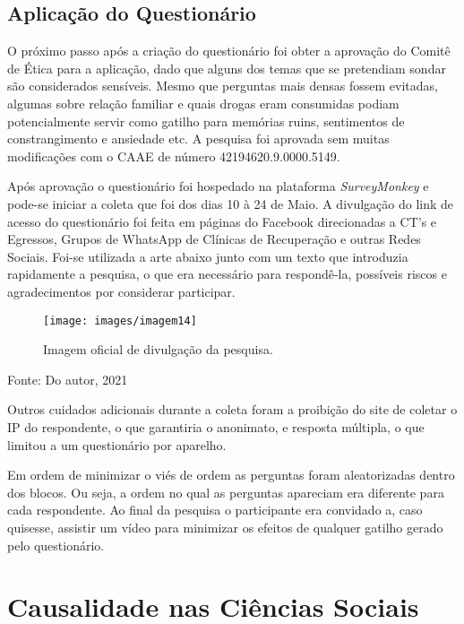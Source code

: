 \documentclass[
	12pt,				%
	oneside,			%
	a4paper,			%
	sumario=tradicional,
	english,			%
	brazil				%
	]{abntex2}
\newcommand{\bcenter}{\begin{center}}
\newcommand{\ecenter}{\end{center}}
\begin{document}
\hypertarget{aplicauxe7uxe3o-do-questionuxe1rio}{%
\subsection{Aplicação do Questionário}\label{aplicauxe7uxe3o-do-questionuxe1rio}}

O próximo passo após a criação do questionário foi obter a aprovação do Comitê de Ética para a aplicação, dado que alguns dos temas que se pretendiam sondar são considerados sensíveis. Mesmo que perguntas mais densas fossem evitadas, algumas sobre relação familiar e quais drogas eram consumidas podiam potencialmente servir como gatilho para memórias ruins, sentimentos de constrangimento e ansiedade etc. A pesquisa foi aprovada sem muitas modificações com o CAAE de número 42194620.9.0000.5149.

Após aprovação o questionário foi hospedado na plataforma \emph{SurveyMonkey} e pode-se iniciar a coleta que foi dos dias 10 à 24 de Maio. A divulgação do link de acesso do questionário foi feita em páginas do Facebook direcionadas a CT's e Egressos, Grupos de WhatsApp de Clínicas de Recuperação e outras Redes Sociais. Foi-se utilizada a arte abaixo junto com um texto que introduzia rapidamente a pesquisa, o que era necessário para respondê-la, possíveis riscos e agradecimentos por considerar participar.
\begin{figure}[H]

{\centering \texttt{[image: images/imagem14]} 

}

\caption{Imagem oficial de divulgação da pesquisa.}\label{fig:imagem14}
\end{figure}
\bcenter

Fonte: Do autor, 2021
\ecenter

Outros cuidados adicionais durante a coleta foram a proibição do site de coletar o IP do respondente, o que garantiria o anonimato, e resposta múltipla, o que limitou a um questionário por aparelho.

Em ordem de minimizar o viés de ordem as perguntas foram aleatorizadas dentro dos blocos. Ou seja, a ordem no qual as perguntas apareciam era diferente para cada respondente. Ao final da pesquisa o participante era convidado a, caso quisesse, assistir um vídeo para minimizar os efeitos de qualquer gatilho gerado pelo questionário.

\hypertarget{causalidade-nas-ciuxeancias-sociais}{%
\section{Causalidade nas Ciências Sociais}\label{causalidade-nas-ciuxeancias-sociais}}
\end{document}
